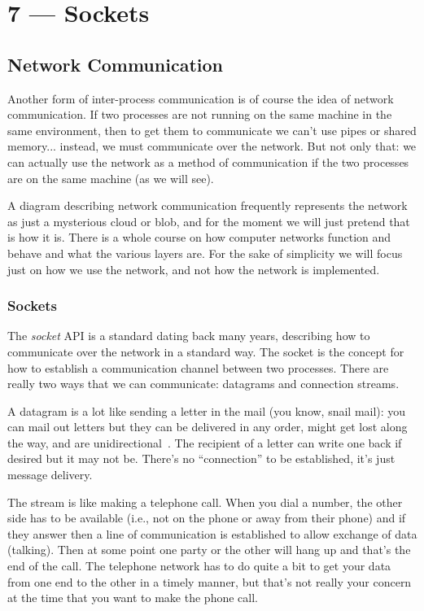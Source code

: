 \documentclass[a4paper]{report}
\begin{document}
\chapter*{7 --- Sockets}


\section*{Network Communication}

Another form of inter-process communication is of course the idea of network communication. If two processes are not running on the same machine in the same environment, then to get them to communicate we can't use pipes or shared memory... instead, we must communicate over the network. But not only that: we can actually use the network as a method of communication if the two processes are on the same machine (as we will see).

A diagram describing network communication frequently represents the network as just a mysterious cloud or blob, and for the moment we will just pretend that is how it is. There is a whole course on how computer networks function and behave and what the various layers are. For the sake of simplicity we will focus just on how we use the network, and not how the network is implemented.

\subsection*{Sockets}

The \textit{socket} API is a standard dating back many years, describing how to communicate over the network in a standard way. The socket is the concept for how to establish a communication channel between two processes. There are really two ways that we can communicate: datagrams and connection streams.

A datagram is a lot like sending a letter in the mail (you know, snail mail): you can mail out letters but they can be delivered in any order, might get lost along the way, and are unidirectional~\cite{apunix}. The recipient of a letter can write one back if desired but it may not be. There's no ``connection'' to be established, it's just message delivery.

The stream is like making a telephone call. When you dial a number, the other side has to be available (i.e., not on the phone or away from their phone) and if they answer then a line of communication is established to allow exchange of data (talking). Then at some point one party or the other will hang up and that's the end of the call. The telephone network has to do quite a bit to get your data from one end to the other in a timely manner, but that's not really your concern at the time that you want to make the phone call.
\end{document}
